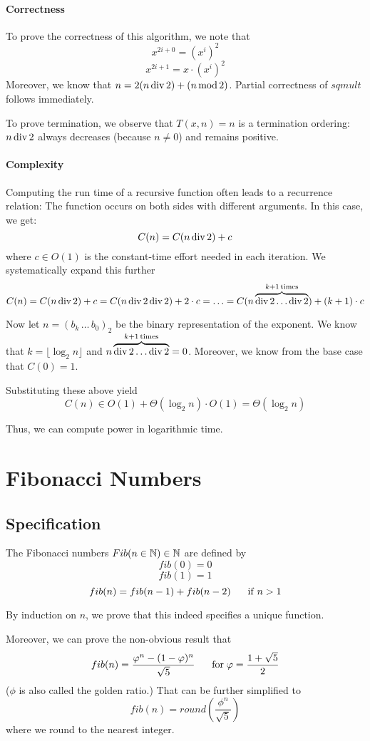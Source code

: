 \paragraph{Correctness}
To prove the correctness of this algorithm, we note that
\[x^{2i+0}=(x^i)^2\]
\[x^{2i+1}=x\cdot(x^i)^2\]
Moreover, we know that $n=2(n\mathop{\mathrm{div}} 2)+(n\mathop{\mathrm{mod}} 2)$.
Partial correctness of $sqmult$ follows immediately.

To prove termination, we observe that $T(x,n)=n$ is a termination ordering: $n\mathop{\mathrm{div}} 2$ always decreases (because $n\neq 0$) and remains positive.

\paragraph{Complexity}
Computing the run time of a recursive function often leads to a recurrence relation: The function occurs on both sides with different arguments.
In this case, we get:
 \[C(n)=C(n\mathop{\mathrm{div}} 2) + c\]
where $c\in O(1)$ is the constant-time effort needed in each iteration.
We systematically expand this further
 \[C(n)=C(n\mathop{\mathrm{div}} 2) + c = C(n\mathop{\mathrm{div}} 2\mathop{\mathrm{div}} 2) + 2\cdot c=\ldots=C(n\overbrace{\mathop{\mathrm{div}} 2\ldots\mathop{\mathrm{div}} 2}^{k+1\,\text{times}})+(k+1)\cdot c\]

Now let $n=(b_k\,\ldots\,b_0)_2$ be the binary representation of the exponent.
We know that $k=\lfloor\log_2 n\rfloor$ and $n\overbrace{\mathop{\mathrm{div}} 2\ldots\mathop{\mathrm{div}} 2}^{k+1\,\text{times}}=0$.
Moreover, we know from the base case that $C(0)=1$.

Substituting these above yield
\[C(n)\in O(1)+\Theta(\log_2 n)\cdot O(1)=\Theta(\log_2 n)\]

Thus, we can compute power in logarithmic time.

\section{Fibonacci Numbers}\label{sec:ad:fib}

\subsection{Specification}\label{sec:ad:fib:spec}

The Fibonacci numbers $Fib(n\in\mathbb{N})\in\mathbb{N}$ are defined by
\[fib(0)=0\]
\[fib(1)=1\]
\[fib(n)=fib(n-1)+fib(n-2) \hspace*{.5cm}\;\mathrm{if}\; n>1\]

By induction on $n$, we prove that this indeed specifies a unique function.

Moreover, we can prove the non-obvious result that
 \[fib(n)=\frac{\varphi^n-(1-\varphi)^n}{\sqrt{5}} \hspace*{.5cm}\;\mathrm{for}\; \varphi=\frac{1+\sqrt{5}}{2}\]
($\phi$ is also called the golden ratio.)
That can be further simplified to
 \[fib(n)=round\left(\frac{\phi^n}{\sqrt{5}}\right)\]
where we round to the nearest integer.

